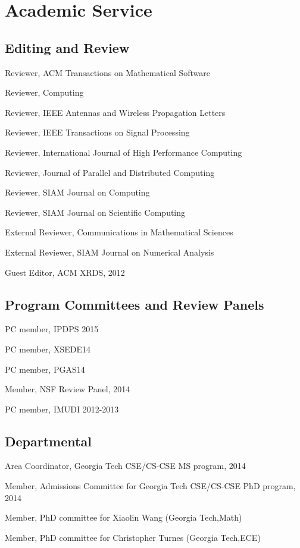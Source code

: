 \documentclass[letterpaper]{article}
\renewenvironment{itemize}{
  \begin{list}{}{
    \setlength{\leftmargin}{1.5em}
  }
}{
  \end{list}
}
\begin{document}
\section*{Academic Service}

\subsection*{Editing and Review}
\begin{itemize}
\item Reviewer, ACM Transactions on Mathematical Software
\item Reviewer, Computing
\item Reviewer, IEEE Antennas and Wireless Propagation Letters
\item Reviewer, IEEE Transactions on Signal Processing
\item Reviewer, International Journal of High Performance Computing
\item Reviewer, Journal of Parallel and Distributed Computing
\item Reviewer, SIAM Journal on Computing
\item Reviewer, SIAM Journal on Scientific Computing
\item External Reviewer, Communications in Mathematical Sciences
\item External Reviewer, SIAM Journal on Numerical Analysis
\item Guest Editor, ACM XRDS, 2012
\end{itemize}

\subsection*{Program Committees and Review Panels}
\begin{itemize}
\item PC member, IPDPS 2015
\item PC member, XSEDE14
\item PC member, PGAS14
\item Member, NSF Review Panel, 2014
\item PC member, IMUDI 2012-2013
\end{itemize}

\subsection*{Departmental}
\begin{itemize}
\item Area Coordinator, Georgia Tech CSE/CS-CSE MS program, 2014
\item Member, Admissions Committee for Georgia Tech CSE/CS-CSE PhD program, 2014
\item Member, PhD committee for Xiaolin Wang (Georgia Tech,Math)
\item Member, PhD committee for Christopher Turnes (Georgia Tech,ECE)
\end{itemize}
\end{document}
